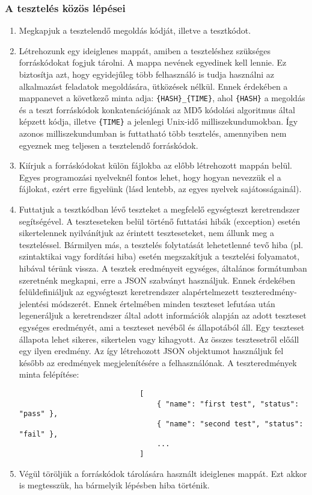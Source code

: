 \documentclass{elteikthesis}
\begin{document}
				\subsubsection{A tesztelés közös lépései}
					\begin{enumerate}
						\item Megkapjuk a tesztelendő megoldás kódját, illetve a tesztkódot.
						\item Létrehozunk egy ideiglenes mappát, amiben a teszteléshez szükséges forráskódokat fogjuk tárolni. A mappa nevének egyedinek kell lennie. Ez biztosítja azt, hogy egyidejűleg több felhasználó is tudja használni az alkalmazást feladatok megoldására, ütközések nélkül. Ennek érdekében a mappanevet a következő minta adja: \texttt{\{HASH\}\_\{TIME\}}, ahol \texttt{\{HASH\}} a megoldás és a teszt forráskódok konkatenációjának az MD5 kódolási algoritmus által képzett kódja, illetve \texttt{\{TIME\}} a jelenlegi Unix-idő milliszekundumokban. Így azonos milliszekundumban is futtatható több tesztelés, amennyiben nem egyeznek meg teljesen a tesztelendő forráskódok.
						\item Kiírjuk a forráskódokat külön fájlokba az előbb létrehozott mappán belül. Egyes programozási nyelveknél fontos lehet, hogy hogyan nevezzük el a fájlokat, ezért erre figyelünk (lásd lentebb, az egyes nyelvek sajátosságainál).
						\item Futtatjuk a tesztkódban lévő teszteket a megfelelő egységteszt keretrendszer segítségével. A teszteseteken belül történő futtatási hibák (exception) esetén sikertelennek nyilvánítjuk az érintett teszteseteket, nem állunk meg a teszteléssel. Bármilyen más, a tesztelés folytatását lehetetlenné tevő hiba (pl. szintaktikai vagy fordítási hiba) esetén megszakítjuk a tesztelési folyamatot, hibával térünk vissza. A tesztek eredményeit egységes, általános formátumban szeretnénk megkapni, erre a JSON szabványt használjuk. Ennek érdekében felüldefiniáljuk az egységteszt keretrendszer alapértelmezett teszteredmény-jelentési módszerét. Ennek értelmében minden teszteset lefutása után legeneráljuk a keretrendszer által adott információk alapján az adott teszteset egységes eredményét, ami a teszteset nevéből és állapotából áll. Egy teszteset állapota lehet sikeres, sikertelen vagy kihagyott. Az összes tesztesetről előáll egy ilyen eredmény. Az így létrehozott JSON objektumot használjuk fel később az eredmények megjelenítésére a felhasználónak. A teszteredmények minta felépítése:
						\begin{verbatim}
							[
								{ "name": "first test", "status": "pass" },
								{ "name": "second test", "status": "fail" },
								...
							]
						\end{verbatim}
						\item Végül töröljük a forráskódok tárolására használt ideiglenes mappát. Ezt akkor is megtesszük, ha bármelyik lépésben hiba történik.
					\end{enumerate}
\end{document}
